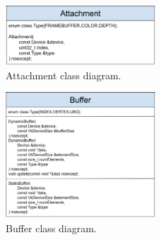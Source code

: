 \documentclass[12pt]{report}
\newcommand{\figurewidth}{0.6\textwidth}
\newcommand{\imagewidth}{0.5\textwidth}
\theoremstyle{definition}
\begin{document}
        \begin{figure}
          \centering
          \includegraphics[width=\imagewidth]{images/class_attachment.png}
          \caption{Attachment class diagram.}
          \label{fig:class_attachment}  
        \end{figure}

  \begin{figure}
    \centering
    \includegraphics[width=\imagewidth]{images/class_buffer.png}
    \caption{Buffer class diagram.}
    \label{fig:class_buffer}  
  \end{figure}
\end{document}
